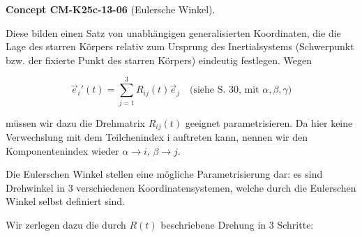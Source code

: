 \documentclass[10pt, letterpaper]{article}
\newcommand{\CustomHeading}[3]{%
  \par\medskip\noindent%
  \textbf{#1 #2} \textnormal{(#3)}.\enskip%
}
\newenvironment{CONC}[2]{\begin{unitbox}\CustomHeading{Concept}{#1}{#2}}{\end{unitbox}}
\begin{document}
\begin{CONC}{CM-K25c-13-06}{Eulersche Winkel}
Diese bilden einen Satz von unabhängigen generalisierten Koordinaten, die die Lage des starren Körpers relativ zum Ursprung des Inertialsystems (Schwerpunkt bzw. der fixierte Punkt des starren Körpers) eindeutig festlegen. Wegen

\[
\vec{e}_i'(t) = \sum_{j=1}^3 R_{ij}(t) \vec{e}_j \quad \text{(siehe S. 30, mit }\alpha,\beta,\gamma\text{)}
\]

\noindent
müssen wir dazu die Drehmatrix $R_{ij}(t)$ geeignet parametrisieren. Da hier keine Verwechslung mit dem Teilchenindex i auftreten kann, nennen wir den Komponentenindex wieder $\alpha \to i$, $\beta \to j$.

Die Eulerschen Winkel stellen eine mögliche Parametrisierung dar: es sind Drehwinkel in 3 verschiedenen Koordinatensystemen, welche durch die Eulerschen Winkel selbst definiert sind.

Wir zerlegen dazu die durch $R(t)$ beschriebene Drehung in 3 Schritte:

\begin{center}
\end{center}
\end{CONC}
\end{document}
